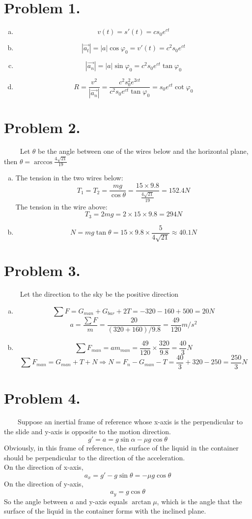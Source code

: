 \documentclass{article}
\begin{document}
\section*{Problem 1.}
	\begin{enumerate}[(a)]
	\item
	$$v(t)=s'(t)=cs_0e^{ct}$$
	\item
	$$|\vec{a_t}|=|a|\cos\varphi_0=v'(t)=c^2s_0e^{ct}$$
	\item
	$$|\vec{a_n}|=|a|\sin\varphi_0=c^2s_0e^{ct}\tan\varphi_0$$
	\item
	$$R=\frac{v^2}{|\vec{a_n}|}=\frac{c^2s_0^2e^{2ct}}{c^2s_0e^{ct}\tan\varphi_0}=s_0e^{ct}\cot\varphi_0$$
	\end{enumerate}
	
\section*{Problem 2.}
	$\quad\quad$ Let $\theta$ be the angle between one of the wires below and the horizontal plane, then $\theta=\arccos\frac{4\sqrt{21}}{19}$
	\begin{enumerate}[(a)]
	\item
	The tension in the two wires below:
	$$T_1=T_2=\frac{mg}{\cos\theta}=\frac{15\times9.8}{\frac{4\sqrt{21}}{19}}=152.4N$$
	The tension in the wire above:
	$$T_3=2mg=2\times15\times9.8=294N$$
	\item
	$$N=mg\tan\theta=15\times9.8\times\frac{5}{4\sqrt{21}}\approx40.1N$$
	\end{enumerate}
	
\section*{Problem 3.}
	$\quad\quad$ Let the direction to the sky be the positive direction
	\begin{enumerate}[(a)]
	\item
	$$\sum F=G_{man}+G_{bar}+2T=-320-160+500=20N$$
	$$a=\frac{\sum F}{m}=\frac{20}{(320+160)/9.8}=\frac{49}{120}m/s^2$$
	\item
	$$\sum F_{man}=am_{man}=\frac{49}{120}\times\frac{320}{9.8}=\frac{40}{3}N$$
	$$\sum F_{man}=G_{man}+T+N\Longrightarrow N=F_n-G_{man}-T=\frac{40}{3}+320-250=\frac{250}{3}N$$
	\end{enumerate}

\section*{Problem 4.}
	$$$$
	$$$$
	$$$$
	$$$$
	$$$$
	$$$$
	$$$$
	$\quad\quad$Suppose an inertial frame of reference whose x-axis is the perpendicular to the slide and y-axis is opposite to the motion direction.
	$$g'=a=g\sin\alpha-\mu g\cos\theta$$
	Obviously, in this frame of reference, the surface of the liquid in the container should be perpendicular to the direction of the acceleration.\\
	On the direction of x-axis, $$a_x=g'-g\sin\theta=-\mu g\cos\theta$$
	On the direction of y-axis, $$a_y=g\cos\theta$$
	So the angle between $a$ and y-axis equals $\arctan\mu$, which is the angle that the surface of the liquid in the container forms with the inclined plane.
	 
\end{document}
